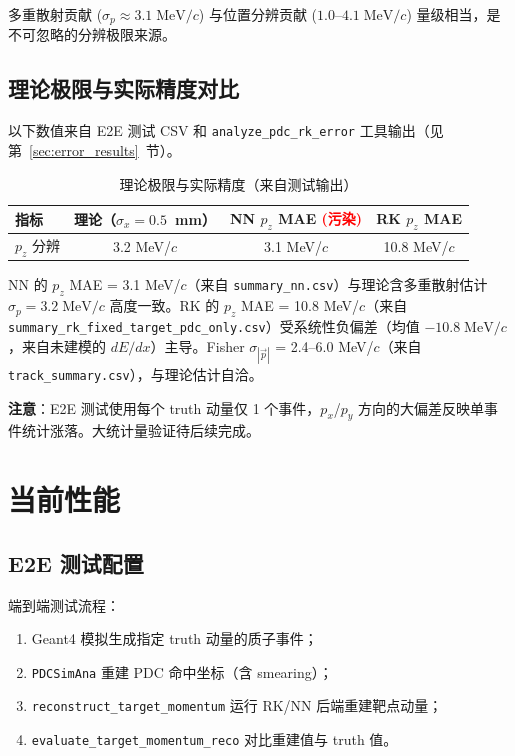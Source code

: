\documentclass[a4paper, 11pt]{article}
\begin{document}
多重散射贡献 ($\sigma_p \approx 3.1\;\mathrm{MeV}/c$) 与位置分辨贡献 ($1.0\text{--}4.1\;\mathrm{MeV}/c$) 量级相当，是不可忽略的分辨极限来源。

\subsection{理论极限与实际精度对比}

以下数值来自 E2E 测试 CSV 和 \texttt{analyze\_pdc\_rk\_error} 工具输出（见第~\ref{sec:error_results}~节）。

\begin{table}[H]
\centering
\caption{理论极限与实际精度（来自测试输出）}
\begin{tabular}{lccc}
\toprule
指标 & 理论（$\sigma_x = 0.5$~mm） & NN $p_z$ MAE \textcolor{red}{(污染)} & RK $p_z$ MAE \\
\midrule
$p_z$ 分辨 & 3.2 MeV/$c$ & 3.1 MeV/$c$ & 10.8 MeV/$c$ \\
\bottomrule
\end{tabular}
\end{table}

NN 的 $p_z$ MAE = 3.1 MeV/$c$（来自 \texttt{summary\_nn.csv}）与理论含多重散射估计 $\sigma_p = 3.2\;\mathrm{MeV}/c$ 高度一致。RK 的 $p_z$ MAE = 10.8 MeV/$c$（来自 \texttt{summary\_rk\_fixed\_target\_pdc\_only.csv}）受系统性负偏差（均值 $-10.8\;\mathrm{MeV}/c$，来自未建模的 $dE/dx$）主导。Fisher $\sigma_{|\vec{p}|}$ = 2.4--6.0 MeV/$c$（来自 \texttt{track\_summary.csv}），与理论估计自洽。

\textbf{注意}：E2E 测试使用每个 truth 动量仅 1 个事件，$p_x$/$p_y$ 方向的大偏差反映单事件统计涨落。大统计量验证待后续完成。

\section{当前性能}
\label{sec:performance}

\subsection{E2E 测试配置}

端到端测试流程：
\begin{enumerate}[nosep]
  \item Geant4 模拟生成指定 truth 动量的质子事件；
  \item \texttt{PDCSimAna} 重建 PDC 命中坐标（含 smearing）；
  \item \texttt{reconstruct\_target\_momentum} 运行 RK/NN 后端重建靶点动量；
  \item \texttt{evaluate\_target\_momentum\_reco} 对比重建值与 truth 值。
\end{enumerate}
\end{document}
